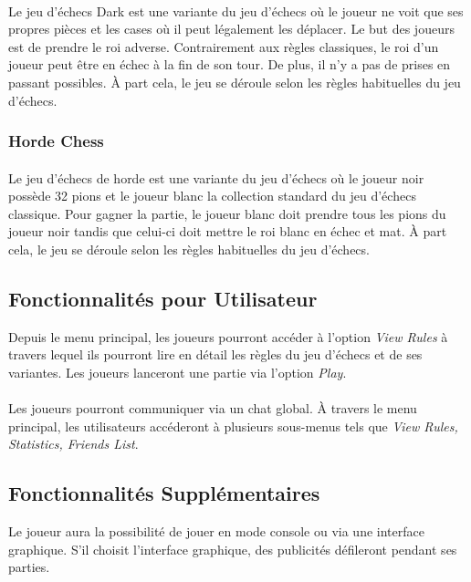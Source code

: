 \documentclass[10pt, a4paper]{article}
\begin{document}
					\paragraph{} Le jeu d'échecs Dark est une variante du jeu d'échecs où le joueur ne voit que ses propres pièces et les cases où il peut légalement les déplacer. Le but des joueurs est de prendre le roi adverse. Contrairement aux règles classiques, le roi d'un joueur peut être en échec à la fin de son tour. De plus, il n'y a pas de prises en passant possibles. À part cela, le jeu se déroule selon les règles habituelles du jeu d'échecs.
				\subsubsection{Horde Chess}
					\paragraph{} Le jeu d'échecs de horde est une variante du jeu d'échecs où le joueur noir possède 32 pions et le joueur blanc la collection standard du jeu d'échecs classique. Pour gagner la partie, le joueur blanc doit prendre tous les pions du joueur noir tandis que celui-ci doit mettre le roi blanc en échec et mat. À part cela, le jeu se déroule selon les règles habituelles du jeu d'échecs.

			\subsection{Fonctionnalités pour Utilisateur}Depuis le menu principal, les joueurs pourront accéder à l'option {\itshape View Rules} à travers lequel ils pourront lire en détail les règles du jeu d'échecs et de ses variantes. Les joueurs lanceront une partie via l'option {\itshape Play}. \\ \\
			Les joueurs pourront communiquer via un chat global. À travers le menu principal, les utilisateurs accéderont à plusieurs sous-menus tels que {\itshape  View Rules, Statistics, Friends List}.%
			\subsection{Fonctionnalités Supplémentaires}
			Le joueur aura la possibilité de jouer en mode console ou via une interface graphique. S'il choisit l'interface graphique, des publicités défileront pendant ses parties.
\end{document}
